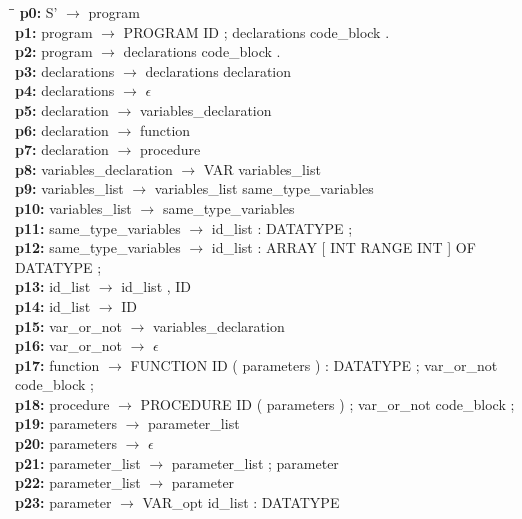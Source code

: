 \documentclass[12pt,a4paper]{report}
\begin{document}
\begin{tabbing}
\hspace{1.3cm}\= \hspace{11cm}\= \kill
\textbf{p0:}  \> S' \(\to\) program \\
\textbf{p1:}  \> program \(\to\) PROGRAM ID ; declarations code\_block . \\
\textbf{p2:}  \> program \(\to\) declarations code\_block . \\
\textbf{p3:}  \> declarations \(\to\) declarations declaration \\
\textbf{p4:}  \> declarations \(\to\) \(\epsilon\) \\
\textbf{p5:}  \> declaration \(\to\) variables\_declaration \\
\textbf{p6:}  \> declaration \(\to\) function \\
\textbf{p7:}  \> declaration \(\to\) procedure \\
\textbf{p8:}  \> variables\_declaration \(\to\) VAR variables\_list \\
\textbf{p9:}  \> variables\_list \(\to\) variables\_list same\_type\_variables \\
\textbf{p10:} \> variables\_list \(\to\) same\_type\_variables \\
\textbf{p11:} \> same\_type\_variables \(\to\) id\_list : DATATYPE ; \\
\textbf{p12:} \> same\_type\_variables \(\to\) id\_list : ARRAY [ INT RANGE INT ] OF DATATYPE ; \\
\textbf{p13:} \> id\_list \(\to\) id\_list , ID \\
\textbf{p14:} \> id\_list \(\to\) ID \\
\textbf{p15:} \> var\_or\_not \(\to\) variables\_declaration \\
\textbf{p16:} \> var\_or\_not \(\to\) \(\epsilon\) \\
\textbf{p17:} \> function \(\to\) FUNCTION ID ( parameters ) : DATATYPE ; var\_or\_not code\_block ; \\
\textbf{p18:} \> procedure \(\to\) PROCEDURE ID ( parameters ) ; var\_or\_not code\_block ; \\
\textbf{p19:} \> parameters \(\to\) parameter\_list \\
\textbf{p20:} \> parameters \(\to\) \(\epsilon\) \\
\textbf{p21:} \> parameter\_list \(\to\) parameter\_list ; parameter \\
\textbf{p22:} \> parameter\_list \(\to\) parameter \\
\textbf{p23:} \> parameter \(\to\) VAR\_opt id\_list : DATATYPE \\

\end{tabbing}
\end{document}
